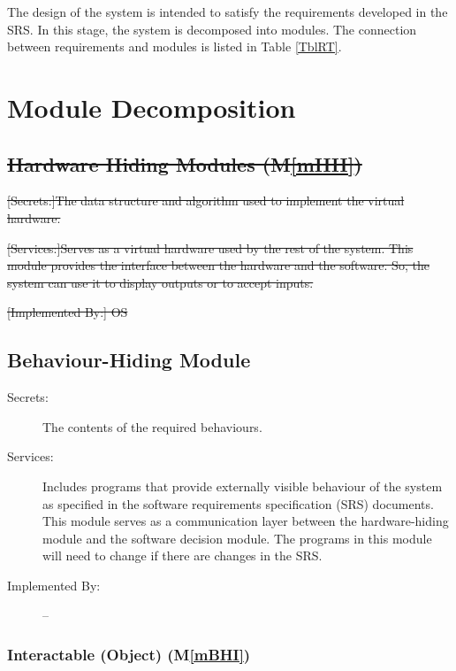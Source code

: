 \documentclass[12pt, titlepage]{article}
\newcommand{\mref}[1]{M\ref{#1}}
\DeclareRobustCommand{\hsout}[1]{\texorpdfstring{\sout{#1}}{#1}}
\begin{document}
The design of the system is intended to satisfy the requirements developed in
the SRS. In this stage, the system is decomposed into modules. The connection
between requirements and modules is listed in Table \ref{TblRT}.

\newpage

\section{Module Decomposition} \label{SecMD}

\subsection{\hsout{Hardware Hiding Modules (\mref{mHH})}}

\begin{description}
\item\sout{[Secrets:]The data structure and algorithm used to implement the virtual
  hardware.}
\item\sout{[Services:]Serves as a virtual hardware used by the rest of the
  system. This module provides the interface between the hardware and the
  software. So, the system can use it to display outputs or to accept inputs.}
\item\sout{[Implemented By:] OS}
\end{description}

\subsection{Behaviour-Hiding Module}

\begin{description}
\item[Secrets:]The contents of the required behaviours.
\item[Services:]Includes programs that provide externally visible behaviour of
  the system as specified in the software requirements specification (SRS)
  documents. This module serves as a communication layer between the
  hardware-hiding module and the software decision module. The programs in this
  module will need to change if there are changes in the SRS.
\item[Implemented By:] --
\end{description}

\subsubsection{Interactable (Object) (\mref{mBHI})}
\end{document}
